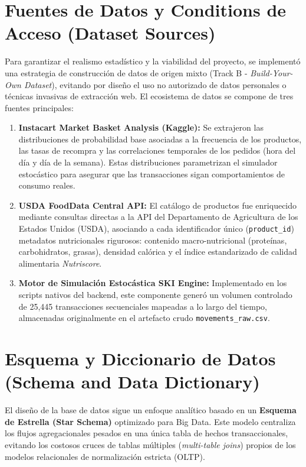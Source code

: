 \documentclass[11pt,a4paper]{article}
\begin{document}
\section{Fuentes de Datos y Conditions de Acceso (Dataset Sources)}
Para garantizar el realismo estadístico y la viabilidad del proyecto, se implementó una estrategia de construcción de datos de origen mixto (Track B - \textit{Build-Your-Own Dataset}), evitando por diseño el uso no autorizado de datos personales o técnicas invasivas de extracción web. El ecosistema de datos se compone de tres fuentes principales:

\begin{enumerate}
    \item \textbf{Instacart Market Basket Analysis (Kaggle):} Se extrajeron las distribuciones de probabilidad base asociadas a la frecuencia de los productos, las tasas de recompra y las correlaciones temporales de los pedidos (hora del día y día de la semana). Estas distribuciones parametrizan el simulador estocástico para asegurar que las transacciones sigan comportamientos de consumo reales.
    \item \textbf{USDA FoodData Central API:} El catálogo de productos fue enriquecido mediante consultas directas a la API del Departamento de Agricultura de los Estados Unidos (USDA), asociando a cada identificador único (\texttt{product\_id}) metadatos nutricionales rigurosos: contenido macro-nutricional (proteínas, carbohidratos, grasas), densidad calórica y el índice estandarizado de calidad alimentaria \textit{Nutriscore}.
    \item \textbf{Motor de Simulación Estocástica SKI Engine:} Implementado en los scripts nativos del backend, este componente generó un volumen controlado de 25,445 transacciones secuenciales mapeadas a lo largo del tiempo, almacenadas originalmente en el artefacto crudo \texttt{movements\_raw.csv}.
\end{enumerate}

\section{Esquema y Diccionario de Datos (Schema and Data Dictionary)}
El diseño de la base de datos sigue un enfoque analítico basado en un \textbf{Esquema de Estrella (Star Schema)} optimizado para Big Data. Este modelo centraliza los flujos agregacionales pesados en una única tabla de hechos transaccionales, evitando los costosos cruces de tablas múltiples (\textit{multi-table joins}) propios de los modelos relacionales de normalización estricta (OLTP).
\end{document}
